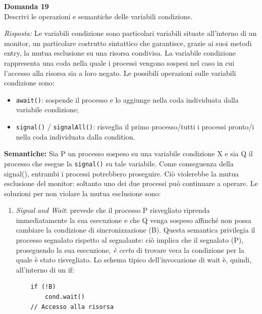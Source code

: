\documentclass{article}
\newenvironment{problem}[2][Domanda]
    { \begin{mdframed}[backgroundcolor=gray!20] \textbf{#1 #2} \\}
    {  \end{mdframed}}
\newenvironment{solution}
    {\textit{Risposta:}}
    {}
\begin{document}
\begin{problem}{19}
Descrivi le operazioni e semantiche delle variabili condizione.
\end{problem}
\begin{solution}
Le variabili condizione sono particolari variabili situate all’interno di un monitor, un particolare costrutto sintattico che garantisce, grazie ai suoi metodi entry, la mutua esclusione su una risorsa condivisa.
\newline
La variabile condizione rappresenta una coda nella quale i processi vengono sospesi nel caso in cui l’accesso alla risorsa sia a loro negato.
\newline
\newline
Le possibili operazioni sulle variabili condizione sono: 
\begin{itemize}
    \item \texttt{await()}: sospende il processo e lo aggiunge nella coda individuata dalla variabile condizione;
    \item \texttt{signal()} / \texttt{signalAll()}: risveglia il primo processo/tutti i processi pronto/i nella coda individuata dalla condition.
\end{itemize}
\textbf{Semantiche:} 
\newline
Sia P un processo sospeso su una variabile condizione X e sia Q il processo che esegue la \texttt{signal()} su tale variabile. Come conseguenza della signal(), entrambi i processi potrebbero proseguire.
\newline
Ciò violerebbe la mutua esclusione del monitor: soltanto uno dei due processi può continuare a operare.
Le soluzioni per non violare la mutua esclusione sono:
\begin{enumerate}
    \item \emph{Signal and Wait}: prevede che il processo P risvegliato riprenda immediatamente la sua esecuzione e che Q venga sospeso affinché non possa cambiare la condizione di sincronizzazione (B). Questa semantica privilegia il processo segnalato rispetto al segnalante: ciò implica che il segnalato (P), proseguendo la sua esecuzione, \textit{è certo} di trovare vera la condizione per la quale è stato risvegliato.
    \newline
    \newline
    Lo schema tipico dell’invocazione di wait è, quindi, all’interno di un if:
    \begin{verbatim}
    if (!B)
        cond.wait()
    // Accesso alla risorsa
    \end{verbatim}

\end{enumerate}
\end{solution}
\end{document}
